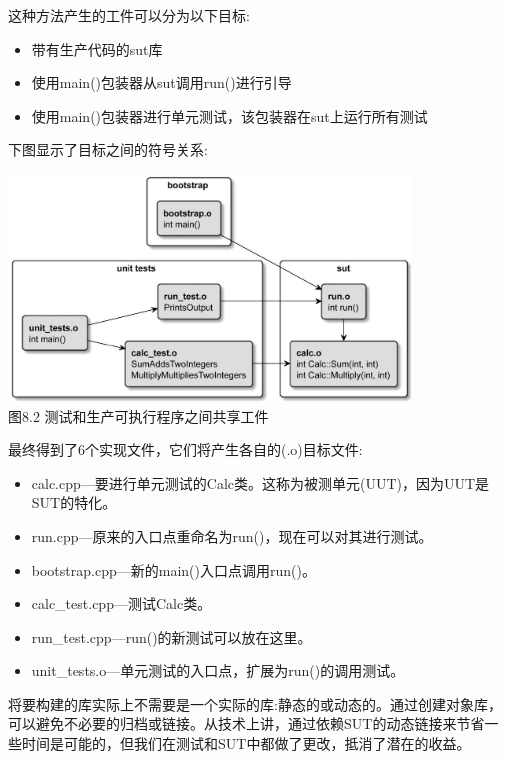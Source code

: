 这种方法产生的工件可以分为以下目标:

\begin{itemize}
\item 
带有生产代码的sut库

\item 
使用main()包装器从sut调用run()进行引导

\item 
使用main()包装器进行单元测试，该包装器在sut上运行所有测试
\end{itemize}

下图显示了目标之间的符号关系:

\begin{center}
\includegraphics[width=0.8\textwidth]{content/3/chapter8/images/2.jpg}\\
图8.2 测试和生产可执行程序之间共享工件
\end{center}

最终得到了6个实现文件，它们将产生各自的(.o)目标文件:

\begin{itemize}
\item 
calc.cpp—要进行单元测试的Calc类。这称为被测单元(UUT)，因为UUT是SUT的特化。

\item 
run.cpp—原来的入口点重命名为run()，现在可以对其进行测试。

\item 
bootstrap.cpp—新的main()入口点调用run()。

\item 
calc\_test.cpp—测试Calc类。

\item 
run\_test.cpp—run()的新测试可以放在这里。

\item 
unit\_tests.o—单元测试的入口点，扩展为run()的调用测试。
\end{itemize}

将要构建的库实际上不需要是一个实际的库:静态的或动态的。通过创建对象库，可以避免不必要的归档或链接。从技术上讲，通过依赖SUT的动态链接来节省一些时间是可能的，但我们在测试和SUT中都做了更改，抵消了潜在的收益。

